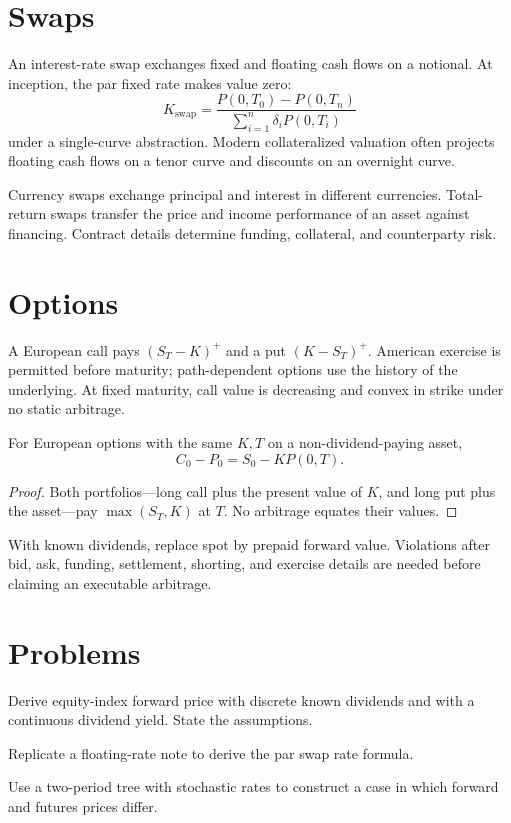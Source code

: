 \section{Swaps}

An interest-rate swap exchanges fixed and floating cash flows on a notional. At
inception, the par fixed rate makes value zero:
\[
K_{\mathrm{swap}}=
\frac{P(0,T_0)-P(0,T_n)}
{\sum_{i=1}^n\delta_iP(0,T_i)}
\]
under a single-curve abstraction. Modern collateralized valuation often projects
floating cash flows on a tenor curve and discounts on an overnight curve.

Currency swaps exchange principal and interest in different currencies. Total-return
swaps transfer the price and income performance of an asset against financing.
Contract details determine funding, collateral, and counterparty risk.

\section{Options}

A European call pays $(S_T-K)^+$ and a put $(K-S_T)^+$. American exercise is
permitted before maturity; path-dependent options use the history of the underlying.
At fixed maturity, call value is decreasing and convex in strike under no static
arbitrage.

\begin{proposition}
For European options with the same $K,T$ on a non-dividend-paying asset,
\[
C_0-P_0=S_0-KP(0,T).
\]
\end{proposition}
\begin{proof}
Both portfolios---long call plus the present value of $K$, and long put plus the
asset---pay $\max(S_T,K)$ at $T$. No arbitrage equates their values.
\end{proof}

With known dividends, replace spot by prepaid forward value. Violations after bid,
ask, funding, settlement, shorting, and exercise details are needed before claiming
an executable arbitrage.

\section{Problems}

\begin{exercise}
Derive equity-index forward price with discrete known dividends and with a continuous
dividend yield. State the assumptions.
\end{exercise}
\begin{exercise}
Replicate a floating-rate note to derive the par swap rate formula.
\end{exercise}
\begin{exercise}
Use a two-period tree with stochastic rates to construct a case in which forward and
futures prices differ.
\end{exercise}


